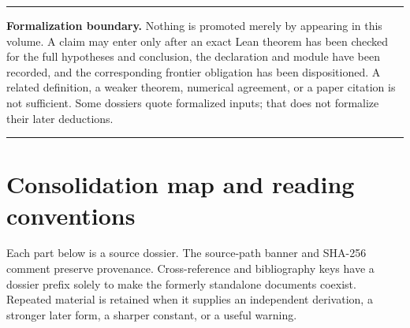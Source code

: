 \documentclass[11pt,oneside]{article}
\theoremstyle{definition}
\theoremstyle{remark}
\newenvironment{boxedremark}{%
  \par\smallskip\noindent\begin{center}\begin{minipage}{0.94\textwidth}%
  \color{black}\hrule\vspace{0.6em}\small
}{%
  \vspace{0.6em}\hrule\end{minipage}\end{center}\smallskip
}
\begin{document}
\begin{abstract}
This volume consolidates every mathematical document formerly stored in a
subdirectory of .
The dossiers contain natural-language proofs, symbolic derivations, numerical checks,
conjectural extensions, and explanations built on top of the current Lean library.  They
are gathered here so that no unformalized claim can be mistaken for part of the verified
primary exposition or lost while awaiting a machine-checked proof.

The merge is intentionally conservative.  Overlapping dossiers and alternative proof
routes remain visible, with editorial precedence notes where one source supersedes a weaker
one.  Standalone preambles, title pages, local tables of contents, and conflicting labels
have been normalized, but mathematical bodies, local status warnings, citations, tables,
algorithms, plots, and open-problem lists are retained.  Editorial corrections made during
consolidation are stated locally rather than silently changing the mathematical record.
\end{abstract}

\begin{boxedremark}
\textbf{Formalization boundary.}
Nothing is promoted merely by appearing in this volume.  A claim may enter
only after an exact Lean theorem has been checked for the full hypotheses and conclusion,
the declaration and module have been recorded, and the corresponding frontier obligation
has been dispositioned.  A related definition, a weaker theorem, numerical agreement, or a
paper citation is not sufficient.  Some dossiers quote formalized inputs; that does not
formalize their later deductions.
\end{boxedremark}

\tableofcontents
\clearpage

\section*{Consolidation map and reading conventions}
Each part below is a source dossier.  The source-path banner and SHA-256 comment preserve
provenance.  Cross-reference and bibliography keys have a dossier prefix solely to make the
formerly standalone documents coexist.  Repeated material is retained when it supplies an
independent derivation, a stronger later form, a sharper constant, or a useful warning.
\end{document}
